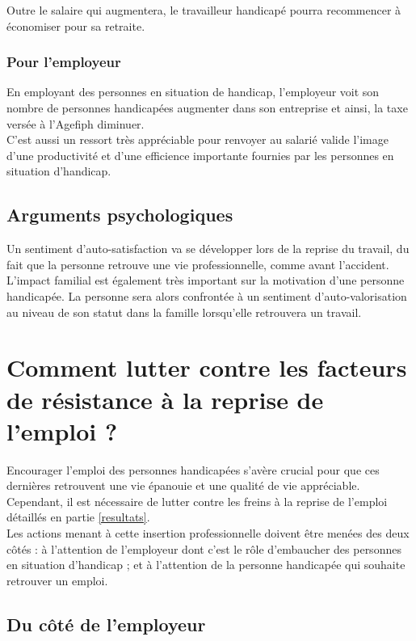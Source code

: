 Outre le salaire qui augmentera, le travailleur handicapé pourra recommencer à économiser pour sa retraite.


\subsubsection{Pour l'employeur}
En employant des personnes en situation de handicap, l'employeur voit son nombre de personnes handicapées augmenter dans son entreprise et ainsi, la taxe versée à l'Agefiph diminuer.\\

C'est aussi un ressort très appréciable pour renvoyer au salarié valide l'image d'une productivité et d'une efficience importante fournies par les personnes en situation d'handicap.

\subsection{Arguments psychologiques}
Un sentiment d'auto-satisfaction va se développer lors de la reprise du travail, du fait que la personne retrouve une vie professionnelle, comme avant l'accident.\\

L'impact familial est également très important sur la motivation d'une personne handicapée. La personne sera alors confrontée à un sentiment d'auto-valorisation au niveau de son statut dans la famille lorsqu'elle retrouvera un travail.





\section{Comment lutter contre les facteurs de résistance à la reprise de l'emploi ?}

Encourager l'emploi des personnes handicapées s'avère crucial pour que ces dernières retrouvent une vie épanouie et une qualité de vie appréciable. Cependant, il est nécessaire de lutter contre les freins à la reprise de l'emploi détaillés en partie \ref{resultats}.\\
Les actions menant à cette insertion professionnelle doivent \^etre menées des deux c\^otés : à l'attention de l'employeur dont c'est le r\^ole d'embaucher des personnes en situation d'handicap ; et à l'attention de la personne handicapée qui souhaite retrouver un emploi.

\subsection{Du c\^oté de l'employeur}

